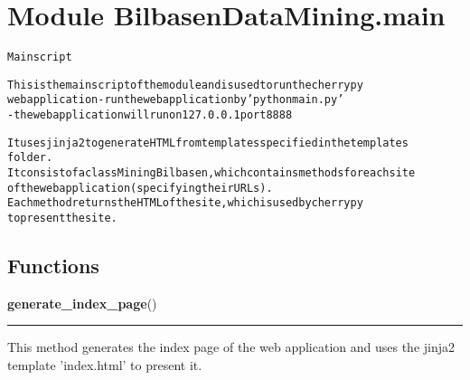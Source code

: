 %
%
%


\section{Module BilbasenDataMining.main}

    \label{BilbasenDataMining:main}
\begin{alltt}

Main script

This is the main script of the module and is used to run the cherrypy
web application - run the web application by 'python main.py'
- the web application will run on 127.0.0.1 port 8888

It uses jinja2 to generate HTML from templates specified in the templates
folder.
It consist of a class MiningBilbasen, which contains methods for each site
of the web application (specifying their URLs).
Each method returns the HTML of the site, which is used by cherrypy
to present the site.
\end{alltt}



  \subsection{Functions}

    \label{BilbasenDataMining:main:generate_index_page}

    \vspace{0.5ex}

\hspace{.8\funcindent}\begin{boxedminipage}{\funcwidth}

    \raggedright \textbf{generate\_index\_page}()

    \vspace{-1.5ex}

    \rule{\textwidth}{0.5\fboxrule}
\setlength{\parskip}{2ex}
    This method generates the index page of the web application and uses 
    the jinja2 template 'index.html' to present it.

\setlength{\parskip}{1ex}
    \end{boxedminipage}


